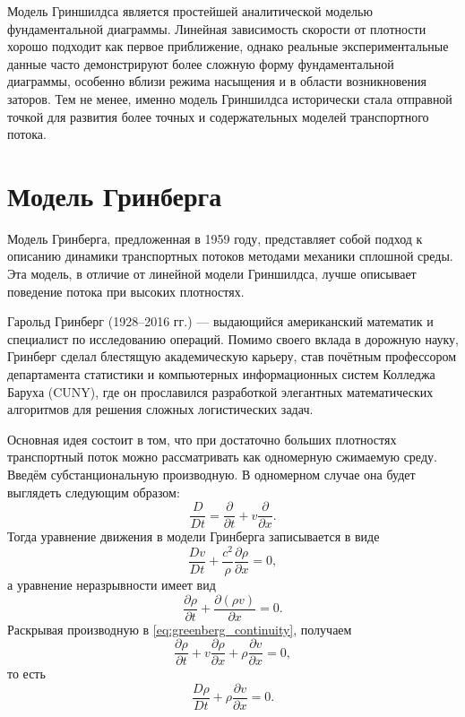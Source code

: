 \documentclass[12pt,a4paper]{article}
\begin{document}
Модель Гриншилдса является простейшей аналитической моделью фундаментальной диаграммы. Линейная зависимость скорости от плотности хорошо подходит как первое приближение, однако реальные экспериментальные данные часто демонстрируют более сложную форму фундаментальной диаграммы, особенно вблизи режима насыщения и в области возникновения заторов. Тем не менее, именно модель Гриншилдса исторически стала отправной точкой для развития более точных и содержательных моделей транспортного потока.

\section{Модель Гринберга}

Модель Гринберга, предложенная в 1959 году, представляет собой подход к описанию динамики транспортных потоков методами механики сплошной среды. Эта модель, в отличие от линейной модели Гриншилдса, лучше описывает поведение потока при высоких плотностях.

Гарольд Гринберг (1928--2016 гг.) --- выдающийся американский математик и специалист по исследованию операций. Помимо своего вклада в дорожную науку, Гринберг сделал блестящую академическую карьеру, став почётным профессором департамента статистики и компьютерных информационных систем Колледжа Баруха (CUNY), где он прославился разработкой элегантных математических алгоритмов для решения сложных логистических задач.

Основная идея состоит в том, что при достаточно больших плотностях транспортный поток можно рассматривать как одномерную сжимаемую среду. Введём субстанциональную производную. В одномерном случае она будет выглядеть следующим образом:
\begin{equation}
\frac{D}{Dt}=\frac{\partial}{\partial t}+v\frac{\partial}{\partial x}.
\label{eq:material_derivative}
\end{equation}
Тогда уравнение движения в модели Гринберга записывается в виде
\begin{equation}
\frac{Dv}{Dt}+\frac{c^2}{\rho}\frac{\partial \rho}{\partial x}=0,
\label{eq:greenberg_motion_material}
\end{equation}
а уравнение неразрывности имеет вид
\begin{equation}
\frac{\partial \rho}{\partial t}+\frac{\partial (\rho v)}{\partial x}=0.
\label{eq:greenberg_continuity}
\end{equation}
Раскрывая производную в \eqref{eq:greenberg_continuity}, получаем
\[
\frac{\partial \rho}{\partial t}+v\frac{\partial \rho}{\partial x}
+\rho\frac{\partial v}{\partial x}=0,
\]
то есть
\begin{equation}
\frac{D\rho}{Dt}+\rho\frac{\partial v}{\partial x}=0.
\label{eq:greenberg_continuity_material}
\end{equation}
\end{document}
